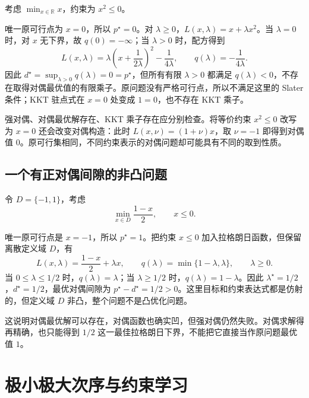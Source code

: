 \documentclass[UTF8,12pt,a4paper,fontset=fandol]{ctexart}
\begin{document}
\begin{example}[上确界没有被取到]
考虑 $\min_{x\in\mathbb R}x$，约束为 $x^2\leq0$。
\end{example}
\begin{solve}
唯一原可行点为 $x=0$，所以 $p^\star=0$。对 $\lambda\geq0$，$L(x,\lambda)=x+\lambda x^2$。当 $\lambda=0$ 时，对 $x$ 无下界，故 $q(0)=-\infty$；当 $\lambda>0$ 时，配方得到
\[
 L(x,\lambda)=\lambda\left(x+\frac{1}{2\lambda}\right)^2
                    -\frac{1}{4\lambda},
 \qquad q(\lambda)=-\frac{1}{4\lambda}.
\]
因此 $d^\star=\sup_{\lambda>0}q(\lambda)=0=p^\star$，但所有有限 $\lambda>0$ 都满足 $q(\lambda)<0$，不存在取得对偶最优值的有限乘子。原问题没有严格可行点，所以不满足这里的 Slater 条件；KKT 驻点式在 $x=0$ 处变成 $1=0$，也不存在 KKT 乘子。
\end{solve}

强对偶、对偶最优解存在、KKT 乘子存在应分别检查。将等价约束 $x^2\leq0$ 改写为 $x=0$ 还会改变对偶构造：此时 $L(x,\nu)=(1+\nu)x$，取 $\nu=-1$ 即得到对偶值 $0$。原可行集相同，不同约束表示的对偶问题却可能具有不同的取到性质。

\subsection{一个有正对偶间隙的非凸问题}

\begin{example}[离散定义域使下界不能达到原最优值]
\label{ex:duality-gap}
令 $D=\{-1,1\}$，考虑
\[
 \min_{x\in D}\frac{1-x}{2},\qquad x\leq0.
\]
\end{example}
\begin{solve}
唯一原可行点是 $x=-1$，所以 $p^\star=1$。把约束 $x\leq0$ 加入拉格朗日函数，但保留离散定义域 $D$，有
\[
 L(x,\lambda)=\frac{1-x}{2}+\lambda x,
 \qquad q(\lambda)=\min\{1-\lambda,\lambda\},\qquad\lambda\geq0.
\]
当 $0\leq\lambda\leq1/2$ 时，$q(\lambda)=\lambda$；当 $\lambda\geq1/2$ 时，$q(\lambda)=1-\lambda$。因此 $\lambda^\star=1/2$，$d^\star=1/2$，最优对偶间隙为 $p^\star-d^\star=1/2>0$。这里目标和约束表达式都是仿射的，但定义域 $D$ 非凸，整个问题不是凸优化问题。
\end{solve}

这说明对偶最优解可以存在，对偶函数也确实凹，但强对偶仍然失败。对偶求解得再精确，也只能得到 $1/2$ 这一最佳拉格朗日下界，不能把它直接当作原问题最优值 $1$。

\section{极小极大次序与约束学习}
\label{sec:duality-minimax}
\end{document}
